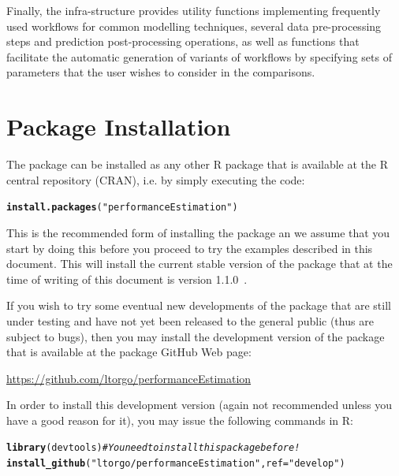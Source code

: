 \documentclass[10pt,a4paper]{article}\usepackage[]{graphicx}\usepackage[]{color}
\makeatletter
\newcommand{\hlstr}[1]{\textcolor[rgb]{0.192,0.494,0.8}{#1}}%
\newcommand{\hlcom}[1]{\textcolor[rgb]{0.678,0.584,0.686}{\textit{#1}}}%
\newcommand{\hlstd}[1]{\textcolor[rgb]{0.345,0.345,0.345}{#1}}%
\newcommand{\hlkwc}[1]{\textcolor[rgb]{0.333,0.667,0.333}{#1}}%
\newcommand{\hlkwd}[1]{\textcolor[rgb]{0.737,0.353,0.396}{\textbf{#1}}}%
\newenvironment{kframe}{%
 \def\at@end@of@kframe{}%
 \ifinner\ifhmode%
  \def\at@end@of@kframe{\end{minipage}}%
  \begin{minipage}{\columnwidth}%
 \fi\fi%
 \def\FrameCommand##1{\hskip\@totalleftmargin \hskip-\fboxsep
 \colorbox{shadecolor}{##1}\hskip-\fboxsep
     \hskip-\linewidth \hskip-\@totalleftmargin \hskip\columnwidth}%
 \MakeFramed {\advance\hsize-\width
   \@totalleftmargin\z@ \linewidth\hsize
   \@setminipage}}%
 {\par\unskip\endMakeFramed%
 \at@end@of@kframe}
\newenvironment{knitrout}{}{} %
\newcommand{\PEversion}{1.1.0\ }
\makeatother
\begin{document}
Finally, the infra-structure provides utility functions
implementing frequently used workflows for common modelling techniques, several data pre-processing steps and prediction post-processing operations, as
well as functions that facilitate the automatic generation of variants
of workflows by specifying sets of parameters that the user wishes to
consider in the comparisons.

\section{Package Installation}\label{sec:install}

The package can be installed as any other R package that is available at the R central repository (CRAN), i.e. by simply executing the code:

\begin{knitrout}\footnotesize
{}\color{fgcolor}\begin{kframe}
\begin{alltt}
\hlkwd{install.packages}\hlstd{(}\hlstr{"performanceEstimation"}\hlstd{)}
\end{alltt}
\end{kframe}
\end{knitrout}

This is the recommended form of installing the package an we assume that you start by doing this before you proceed to try the examples described in this document. This will install the current stable version of the package that at the time of writing of this document is version \PEversion.

If you wish to try some eventual new developments of the package that are still under testing and have not yet been released to the general public (thus are subject to bugs), then you may install the development version of the package that is available at the package GitHub Web page:

\url{https://github.com/ltorgo/performanceEstimation}

In order to install this development version (again not recommended unless you have a good reason for it), you may issue the following commands in R:

\begin{knitrout}\footnotesize
{}\color{fgcolor}\begin{kframe}
\begin{alltt}
\hlkwd{library}\hlstd{(devtools)}  \hlcom{# You need to install this package before!}
\hlkwd{install_github}\hlstd{(}\hlstr{"ltorgo/performanceEstimation"}\hlstd{,}\hlkwc{ref}\hlstd{=}\hlstr{"develop"}\hlstd{)}
\end{alltt}
\end{kframe}
\end{knitrout}
\end{document}
